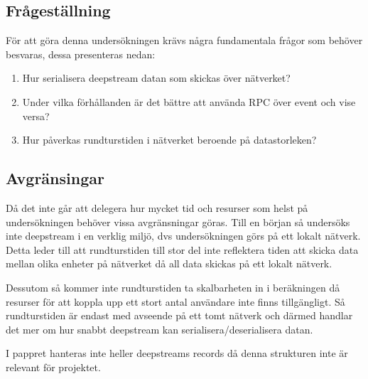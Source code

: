 \subsection{Frågeställning}
\label{subsec:tim-research-questions}
För att göra denna undersökningen krävs några fundamentala frågor som behöver besvaras, dessa presenteras nedan:
\begin{enumerate}

\item\label{tim-fs:1} Hur serialisera deepstream datan som skickas över nätverket?

\item\label{tim-fs:2} Under vilka förhållanden är det bättre att använda RPC över event och vise versa?

\item\label{tim-fs:3} Hur påverkas rundturstiden i nätverket beroende på datastorleken?  

\end{enumerate}

\subsection{Avgränsingar}
\label{subsec:tim-delimitations}
Då det inte går att delegera hur mycket tid och resurser som helst på undersökningen behöver vissa avgränsningar göras. Till en början så undersöks inte deepstream i en verklig miljö, dvs undersökningen görs på ett lokalt nätverk. Detta leder till att rundturstiden till stor del inte reflektera tiden att skicka data mellan olika enheter på nätverket då all data skickas på ett lokalt nätverk.

Dessutom så kommer inte rundturstiden ta skalbarheten in i beräkningen då resurser för att koppla upp ett stort antal användare inte finns tillgängligt. Så rundturstiden är endast med avseende på ett tomt nätverk och därmed handlar det mer om hur snabbt deepstream kan serialisera/deserialisera datan.

I pappret hanteras inte heller deepstreams records då denna strukturen inte är relevant för projektet.
